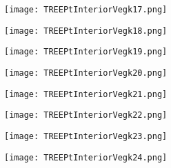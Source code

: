 \documentclass[pdf]{beamer}
\begin{document}
\begin{frame}
\begin{figure}[!h]
\centering
\texttt{[image: TREEPtInteriorVegk17.png]}
\end{figure}
\end{frame}

\begin{frame}
\begin{figure}[!h]
\centering
\texttt{[image: TREEPtInteriorVegk18.png]}
\end{figure}
\end{frame}

\begin{frame}
\begin{figure}[!h]
\centering
\texttt{[image: TREEPtInteriorVegk19.png]}
\end{figure}
\end{frame}

\begin{frame}
\begin{figure}[!h]
\centering
\texttt{[image: TREEPtInteriorVegk20.png]}
\end{figure}
\end{frame}

\begin{frame}
\begin{figure}[!h]
\centering
\texttt{[image: TREEPtInteriorVegk21.png]}
\end{figure}
\end{frame}

\begin{frame}
\begin{figure}[!h]
\centering
\texttt{[image: TREEPtInteriorVegk22.png]}
\end{figure}
\end{frame}

\begin{frame}
\begin{figure}[!h]
\centering
\texttt{[image: TREEPtInteriorVegk23.png]}
\end{figure}
\end{frame}

\begin{frame}
\begin{figure}[!h]
\centering
\texttt{[image: TREEPtInteriorVegk24.png]}
\end{figure}
\end{frame}
\end{document}
